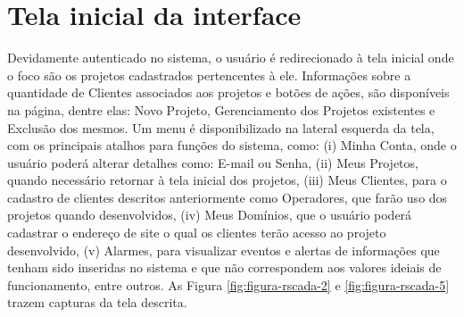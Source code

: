 \section{Tela inicial da interface}
\label{sec:tela-inicial}
Devidamente autenticado no sistema, o usuário é redirecionado à tela inicial onde o foco são os projetos cadastrados pertencentes à ele. Informações sobre a quantidade de Clientes associados aos projetos e botões de ações, são disponíveis na página, dentre elas: Novo Projeto, Gerenciamento dos Projetos existentes e Exclusão dos mesmos. Um menu é disponibilizado na lateral esquerda da tela, com os principais atalhos para funções do sistema, como: (i) Minha Conta, onde o usuário poderá alterar detalhes como: E-mail ou Senha, (ii) Meus Projetos, quando necessário retornar à tela inicial dos projetos, (iii) Meus Clientes, para o cadastro de clientes descritos anteriormente como Operadores, que farão uso dos projetos quando desenvolvidos, (iv) Meus Domínios, que o usuário poderá cadastrar o endereço de site o qual os clientes terão acesso ao projeto desenvolvido, (v) Alarmes, para visualizar eventos e alertas de informações que tenham sido inseridas no sistema e que não correspondem aos valores ideiais de funcionamento, entre outros. As Figura \ref{fig:figura-rscada-2} e \ref{fig:figura-rscada-5} trazem capturas da tela descrita.

        \begin{figure}[!h]
    	\end{figure}
    	
    	\begin{figure}[!h]
    	\end{figure}

